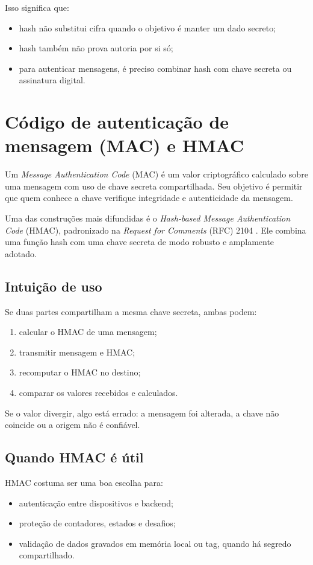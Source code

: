 Isso significa que:
\begin{itemize}[leftmargin=*]
  \item hash não substitui cifra quando o objetivo é manter um dado secreto;
  \item hash também não prova autoria por si só;
  \item para autenticar mensagens, é preciso combinar hash com chave secreta ou assinatura digital.
\end{itemize}

\section{Código de autenticação de mensagem (MAC) e HMAC}
Um \textit{Message Authentication Code} (MAC) é um valor criptográfico calculado sobre uma mensagem com uso de chave secreta compartilhada. Seu objetivo é permitir que quem conhece a chave verifique integridade e autenticidade da mensagem.

Uma das construções mais difundidas é o \textit{Hash-based Message Authentication Code} (HMAC), padronizado na \textit{Request for Comments} (RFC) 2104 \citep{rfc2104}. Ele combina uma função hash com uma chave secreta de modo robusto e amplamente adotado.

\subsection{Intuição de uso}
Se duas partes compartilham a mesma chave secreta, ambas podem:
\begin{enumerate}[leftmargin=*]
  \item calcular o HMAC de uma mensagem;
  \item transmitir mensagem e HMAC;
  \item recomputar o HMAC no destino;
  \item comparar os valores recebidos e calculados.
\end{enumerate}

Se o valor divergir, algo está errado: a mensagem foi alterada, a chave não coincide ou a origem não é confiável.

\subsection{Quando HMAC é útil}
HMAC costuma ser uma boa escolha para:
\begin{itemize}[leftmargin=*]
  \item autenticação entre dispositivos e backend;
  \item proteção de contadores, estados e desafios;
  \item validação de dados gravados em memória local ou tag, quando há segredo compartilhado.
\end{itemize}

